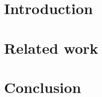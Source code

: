 \documentclass[twoside,11pt,openright,a4paper]{report}
\begin{document}


\chapter{Introduction}
\label{ch:intro}



\chapter{Related work}
\label{ch:related}





\chapter{Conclusion}
\label{ch:conclusion}

\todo{\dots}


\printbibliography{}
\end{document}
